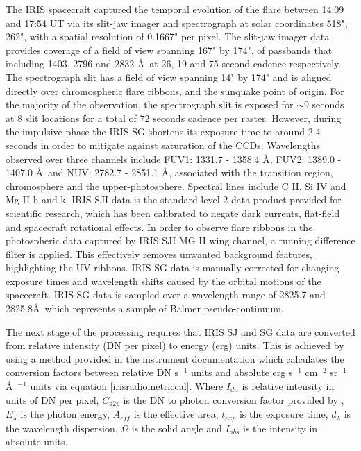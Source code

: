 The IRIS spacecraft captured the temporal evolution of the flare between 14:09 and 17:54 UT via its slit-jaw imager and spectrograph at solar coordinates 518", 262", with a spatial resolution of 0.1667" per pixel. The slit-jaw imager data provides coverage of a field of view spanning 167" by 174", of passbands that including 1403, 2796 and 2832 \AA\ at 26, 19 and 75 second cadence respectively. The spectrograph slit has a field of view spanning 14" by 174" and is aligned directly over chromospheric flare ribbons, and the sunquake point of origin. For the majority of the observation, the spectrograph slit is exposed for $\sim9$ seconds at 8 slit locations for a total of 72 seconds cadence per raster. However, during the impulsive phase the IRIS SG shortens its exposure time to around 2.4 seconds in order to mitigate against saturation of the CCDs. Wavelengths observed over three channels include FUV1: 1331.7 - 1358.4 \AA, FUV2: 1389.0 - 1407.0 \AA\ and NUV: 2782.7 - 2851.1 \AA, associated with the transition region, chromosphere and the upper-photosphere. Spectral lines include C II, Si IV and Mg II h and k. IRIS SJI data is the standard level 2 data product provided for scientific research, which has been calibrated to negate dark currents, flat-field and spacecraft rotational effects. In order to observe flare ribbons in the photospheric data captured by IRIS SJI MG II wing channel, a running difference filter is applied. This effectively removes unwanted background features, highlighting the UV ribbons. IRIS SG data is manually corrected for changing exposure times and wavelength shifts caused by the orbital motions of the spacecraft. IRIS SG data is sampled over a wavelength range of 2825.7 and 2825.8\AA\ which represents a sample of Balmer pseudo-continuum. 

The next stage of the processing requires that IRIS SJ and SG data are converted from relative intensity (DN per pixel) to energy (erg) units. This is achieved by using a method provided in the instrument documentation \citep{2014SoPh..289.2733D} which calculates the conversion factors between relative DN s$^{-1}$ units and absolute erg s$^{-1}$ cm$^{-2}$ sr$^{-1}$ \AA\ $^{-1}$ units via equation \ref{irisradiometriccal}. Where $I_{dn}$ is relative intensity in units of DN per pixel, $C_{d2p}$ is the DN to photon conversion factor provided by \cite{2014SoPh..289.2733D}, $E_{\lambda}$ is the photon energy, $A_{eff}$ is the effective area, $t_{exp}$ is the exposure time, $d_{\lambda}$ is the wavelength dispersion, $\Omega$ is the solid angle and $I_{abs}$ is the intensity in absolute units.

